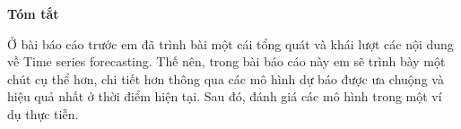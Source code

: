 \newpage
{\LARGE \textbf{Tóm tắt}}

\bigskip
Ở bài báo cáo trước em đã trình bài một cái tổng quát và khái lượt các nội dung về
Time series forecasting. Thế nên, trong bài báo cáo này em sẽ trình bày một chút
cụ thể hơn, chi tiết hơn thông qua các mô hình dự báo được ưa chuộng và hiệu quả
nhất ở thời điểm hiện tại. Sau đó, đánh giá các mô hình trong một ví dụ thực tiễn.